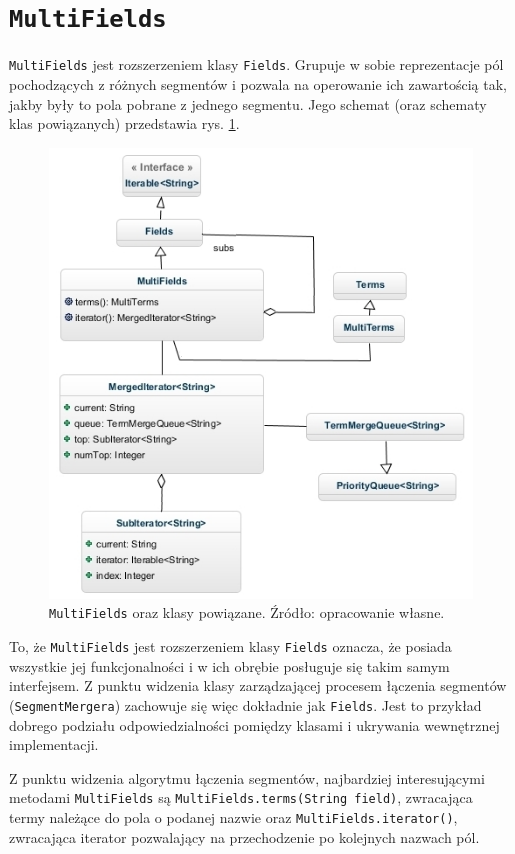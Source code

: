\section{\texttt{MultiFields}}

\texttt{MultiFields} jest rozszerzeniem klasy \texttt{Fields}. Grupuje w sobie reprezentacje pól pochodzących z różnych segmentów i pozwala na operowanie ich zawartością tak, jakby były to pola pobrane z jednego segmentu. Jego schemat (oraz schematy klas powiązanych) przedstawia rys. \ref{multiFields}.

\begin{figure}[here]
 \includegraphics[scale=0.65]{pictures/MultiFields_2.jpg}
 \caption{\texttt{MultiFields} oraz klasy powiązane. Źródło: opracowanie własne.\label{multiFields}}
\end{figure}

To, że \texttt{MultiFields} jest rozszerzeniem klasy \texttt{Fields} oznacza, że posiada wszystkie jej funkcjonalności i w ich obrębie posługuje się takim samym interfejsem. Z punktu widzenia klasy zarządzającej procesem łączenia segmentów (\texttt{SegmentMergera}) zachowuje się więc dokładnie jak \texttt{Fields}. Jest to przykład dobrego podziału odpowiedzialności pomiędzy klasami i ukrywania wewnętrznej implementacji.

Z punktu widzenia algorytmu łączenia segmentów, najbardziej interesującymi metodami \texttt{MultiFields} są \texttt{MultiFields.terms(String field)}, zwracająca termy należące do pola o podanej nazwie oraz \texttt{MultiFields.iterator()}, zwracająca iterator pozwalający na przechodzenie po kolejnych nazwach pól. 

